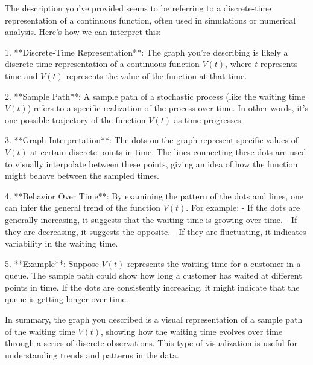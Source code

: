 The description you've provided seems to be referring to a discrete-time representation of a continuous function, often used in simulations or numerical analysis. Here's how we can interpret this:

1. **Discrete-Time Representation**: The graph you're describing is likely a discrete-time representation of a continuous function \( V(t) \), where \( t \) represents time and \( V(t) \) represents the value of the function at that time.

2. **Sample Path**: A sample path of a stochastic process (like the waiting time \( V(t) \)) refers to a specific realization of the process over time. In other words, it's one possible trajectory of the function \( V(t) \) as time progresses.

3. **Graph Interpretation**: The dots on the graph represent specific values of \( V(t) \) at certain discrete points in time. The lines connecting these dots are used to visually interpolate between these points, giving an idea of how the function might behave between the sampled times.

4. **Behavior Over Time**: By examining the pattern of the dots and lines, one can infer the general trend of the function \( V(t) \). For example:
   - If the dots are generally increasing, it suggests that the waiting time is growing over time.
   - If they are decreasing, it suggests the opposite.
   - If they are fluctuating, it indicates variability in the waiting time.

5. **Example**: Suppose \( V(t) \) represents the waiting time for a customer in a queue. The sample path could show how long a customer has waited at different points in time. If the dots are consistently increasing, it might indicate that the queue is getting longer over time.

In summary, the graph you described is a visual representation of a sample path of the waiting time \( V(t) \), showing how the waiting time evolves over time through a series of discrete observations. This type of visualization is useful for understanding trends and patterns in the data.